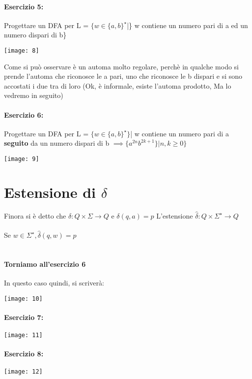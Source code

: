 \documentclass[12pt, a4paper, openany, oneside]{book}
\begin{document}
\paragraph{Esercizio 5: }Progettare un DFA per L = $\{w\in \{a,b\}^{\star}$|\}
w contiene un numero pari di a ed un numero dispari di b\}
\begin{center}
\texttt{[image: 8]}
\end{center}
Come si può osservare è un automa molto regolare, perchè in qualche modo
si prende l'automa che riconosce le a pari, uno che riconosce le b dispari e 
si sono accostati i due tra di loro (Ok, è informale, esiste l'automa prodotto,
Ma lo vedremo in seguito)
\paragraph{Esercizio 6: } Progettare un DFA per L = $\{w\in \{a,b\}^{\star}\}$|
w contiene un numero pari di a \textbf{seguito} da un numero
dispari di b $\implies \{a^{2n}b^{2k+1}\} | n, k \geq 0\}$
\begin{center}
\texttt{[image: 9]}
\end{center}
\section{Estensione di $\delta$}
Finora si è detto che $\delta:Q \times \Sigma \to Q$ e $\delta(q,a) = p$ 
L'estensione $\widehat{\delta}:Q \times \Sigma^{\star}\to Q$ \\ \\
Se $w\in \Sigma^{\star}, \widehat{\delta}(q,w) = p$\\ \\
\paragraph{Torniamo all'esercizio 6} In questo caso quindi, si scriverà:
\begin{center}
\texttt{[image: 10]}
\end{center}
\paragraph{Esercizio 7: }
\begin{center}
\texttt{[image: 11]}
\end{center}
\paragraph{Esercizio 8: }
\begin{center}
\texttt{[image: 12]}
\end{center}
\end{document}
